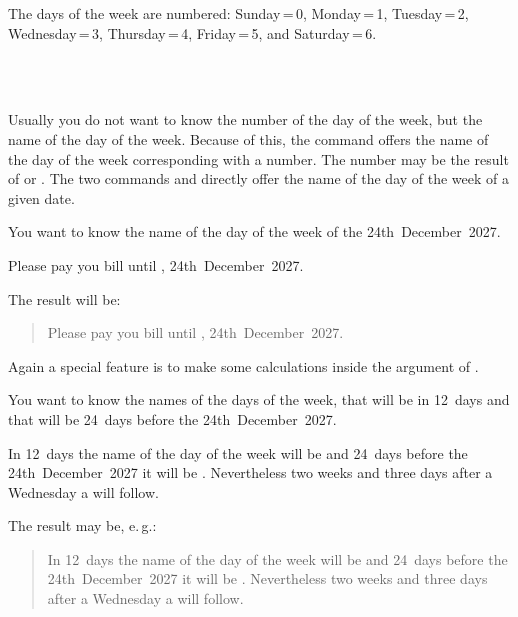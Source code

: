 The days of the week are numbered: Sunday\,=\,0, Monday\,=\,1, Tuesday\,=\,2,
Wednesday\,=\,3, Thursday\,=\,4, Friday\,=\,5, and Saturday\,=\,6.%
%
%
%


\begin{Declaration}
  \\%
  \\%
\end{Declaration}%
%
%
%
Usually you do not want to know the number
of the day of the week, but the name of the day of the week. Because of this,
the command  offers the name of the day of the week
corresponding with a number. The number may be the result of 
or . The two commands  and
 directly offer the name of the day of the week of a given
date.

\begin{Example}
  You want to know the name of the day of the week of the 24th~December~2027.
\begin{lstcode}
  Please pay you bill until ,
  24th~December~2027.
\end{lstcode}
  The result will be:
  \begin{quote}
    Please pay you bill until ,
    24th~December~2027.
  \end{quote}
\end{Example}

Again a special feature is to make some calculations inside the argument of
.
\begin{Example}
  You want to know the names of the days of the week, that will be in 12~days
  and that will be 24~days before the 24th~December~2027.
\begin{lstcode}
  In 12~days the name of the day of the week
  will be  and
  24~days before the 24th~December~2027 it will be
  . Nevertheless two weeks
  and three days after a Wednesday a
   will follow.
\end{lstcode}
  The result may be, e.\,g.:
  \begin{quote}
    In 12~days the name of the day of the week
    will be  and
    24~days before the 24th~December~2027 it will be
    . Nevertheless two weeks
    and three days after a Wednesday a
     will follow.
  \end{quote}
\end{Example}%
%
%
%
%


